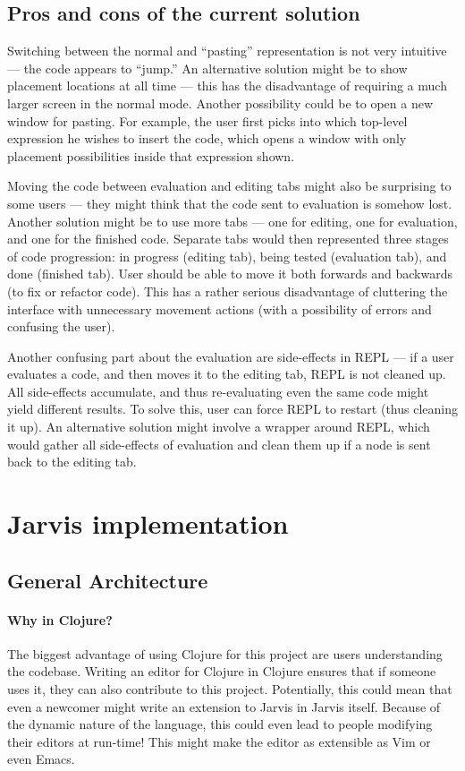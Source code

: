 \documentclass[english,mgr,shortabstract]{iithesis}
\begin{document}
\section{Pros and cons of the current solution}
Switching between the normal and ``pasting'' representation is not very intuitive
--- the code appears to ``jump.''
An alternative solution might be to show placement locations at all time --- this
has the disadvantage of requiring a much larger screen in the normal mode.
Another possibility could be to open a new window for pasting.
For example, the user first picks into which top-level expression he wishes to
insert the code, which opens a window with only placement possibilities inside
that expression shown.

Moving the code between evaluation and editing tabs might also be surprising to
some users --- they might think that the code sent to evaluation is somehow lost.
Another solution might be to use more tabs --- one for editing, one for
evaluation, and one for the finished code.
Separate tabs would then represented three stages of code progression: in
progress (editing tab), being tested (evaluation tab), and done (finished tab).
User should be able to move it both forwards and backwards (to fix or refactor
code).
This has a rather serious disadvantage of cluttering the interface with
unnecessary movement actions (with a possibility of errors and confusing the
user).

Another confusing part about the evaluation are side-effects in REPL --- if a user
evaluates a code, and then moves it to the editing tab, REPL is not cleaned up.
All side-effects accumulate, and thus re-evaluating even the same code might
yield different results.
To solve this, user can force REPL to restart (thus cleaning it up).
An alternative solution might involve a wrapper around REPL, which would gather
all side-effects of evaluation and clean them up if a node is sent back to
the editing tab.


\chapter{Jarvis implementation}
\section{General Architecture}
\subsubsection{Why in Clojure?}
The biggest advantage of using Clojure for this project are users understanding
the codebase.
Writing an editor for Clojure in Clojure ensures that if someone uses it, they
can also contribute to this project.
Potentially, this could mean that even a newcomer might write an extension to
Jarvis in Jarvis itself.
Because of the dynamic nature of the language, this could even lead to people
modifying their editors at run-time! This might make the editor as extensible as
Vim or even Emacs.
\end{document}
